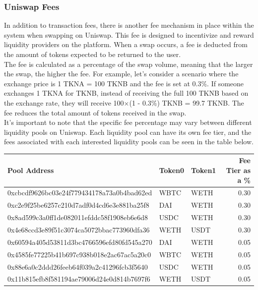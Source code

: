 \subsubsection{Uniswap Fees}
In addition to transaction fees, there is another fee mechanism in place within the system when swapping on Uniswap. This fee is designed to incentivize and reward liquidity providers on the platform. When a swap occurs, a fee is deducted from the amount of tokens expected to be returned to the user.
\\[5mm]
The fee is calculated as a percentage of the swap volume, meaning that the larger the swap, the higher the fee. For example, let's consider a scenario where the exchange price is 1 TKNA = 100 TKNB and the fee is set at 0.3\%. If someone exchanges 1 TKNA for TKNB, instead of receiving the full 100 TKNB based on the exchange rate, they will receive 100$\times$(1 - 0.3\%) TKNB = 99.7 TKNB. The fee reduces the total amount of tokens received in the swap.
\\[5mm]
It's important to note that the specific fee percentage may vary between different liquidity pools on Uniswap. Each liquidity pool can have its own fee tier, and the fees associated with each interested liquidity pools can be seen in the table below.

\begin{table}[!htb]
    \begin{tabular}{|l|l|l|r|}
        \hline
                                      Pool Address & Token0 & Token1 &  Fee Tier as a \% \\\hline\hline
        0xcbcdf9626bc03e24f779434178a73a0b4bad62ed &   WBTC &   WETH &     0.30 \\\hline
        0xc2e9f25be6257c210d7adf0d4cd6e3e881ba25f8 &    DAI &   WETH &     0.30 \\\hline
        0x8ad599c3a0ff1de082011efddc58f1908eb6e6d8 &   USDC &   WETH &     0.30 \\\hline
        0x4e68ccd3e89f51c3074ca5072bbac773960dfa36 &   WETH &   USDT &     0.30 \\\hline
        0x60594a405d53811d3bc4766596efd80fd545a270 &    DAI &   WETH &     0.05 \\\hline
        0x4585fe77225b41b697c938b018e2ac67ac5a20c0 &   WBTC &   WETH &     0.05 \\\hline
        0x88e6a0c2ddd26feeb64f039a2c41296fcb3f5640 &   USDC &   WETH &     0.05 \\\hline
        0x11b815efb8f581194ae79006d24e0d814b7697f6 &   WETH &   USDT &     0.05 \\\hline
    \end{tabular}
\end{table}

